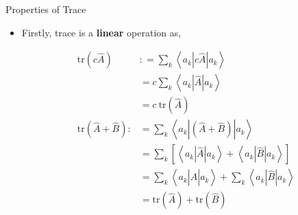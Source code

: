 \documentclass[9pt,handout]{beamer}
\newcommand{\tr}[0]{\text{tr}}
\begin{document}
\begin{frame}{Properties of Trace}
\begin{itemize}
\item Firstly, trace is a \textbf{linear} operation as,

\begin{align*}
\tr \left( c \widehat{A} \right) & : = \sum_k \left\langle a_k \left\lvert c \widehat{A} \right\rvert a_k \right\rangle \\
& = c \sum_k \left\langle a_k \left\lvert \widehat{A} \right\rvert a_k \right\rangle \\
& = c \: \tr \left( \widehat{A} \right) \\
\tr \left( \widehat{A} + \widehat{B} \right) : & = \sum_k \left\langle a_k \left\lvert \left( \widehat{A} + \widehat{B} \right) \right\rvert a_k \right\rangle \\
& = \sum_k \left[ \left\langle a_k \left\lvert \widehat{A} \right\rvert a_k \right\rangle + \left\langle a_k \left\lvert \widehat{B} \right\rvert a_k \right\rangle \right] \\
& = \sum_k \left\langle a_k \left\lvert \widehat{A} \right\rvert a_k \right\rangle + \sum_k \left\langle a_k \left\lvert \widehat{B} \right\rvert a_k \right\rangle \\
& = \tr \left( \widehat{A} \right) + \tr \left( \widehat{B} \right)
\end{align*}
\end{itemize}
\end{frame}
\end{document}
